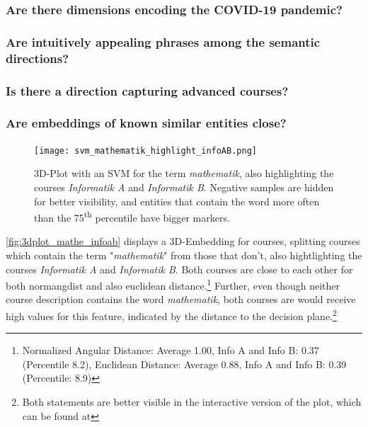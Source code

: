 
\subsubsection{Are there dimensions encoding the COVID-19 pandemic?}


\subsubsection{Are intuitively appealing phrases among the semantic directions?}


\subsubsection{Is there a direction capturing advanced courses?}


\subsubsection{Are embeddings of known similar entities close?}

\begin{figure}[H]
	\centering
	\texttt{[image: svm\_mathematik\_highlight\_infoAB.png]}
	\caption[3D-Plot with an SVM for the term \textit{mathematik}]{
		\label{fig:3dplot_mathe_infoab}
		3D-Plot with an SVM for the term \textit{mathematik}, also highlighting the courses \textit{Informatik A} and \textit{Informatik B}. Negative samples are hidden for better visibility, and entities that contain the word more often than the 75\textsuperscript{th} percentile have bigger markers.
	}
\end{figure}

\autoref{fig:3dplot_mathe_infoab} displays a 3D-Embedding for courses, splitting courses which contain the term "\textit{mathematik}" from those that don't, also hightlighting the courses \textit{Informatik A} and \textit{Informatik B}. Both courses are close to each other for both \gls{normangdist} and also euclidean distance.\footnote{Normalized Angular Distance: Average 1.00, Info A and Info B: 0.37 (Percentile 8.2), Euclidean Distance: Average 0.88, Info A and Info B: 0.39 (Percentile: 8.9)}
Further, even though neither course description contains the word \textit{mathematik}, both courses are would receive high values for this feature, indicated by the distance to the decision plane.\footnote{Both statements are better visible in the interactive version of the plot, which can be found at }


